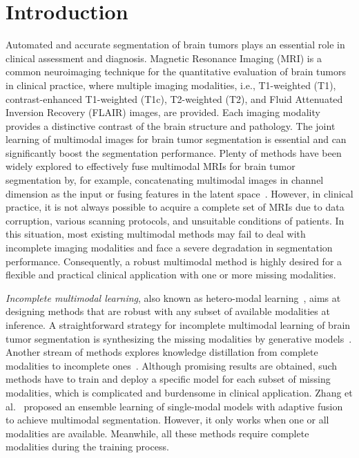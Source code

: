 \documentclass[runningheads]{llncs}
\begin{document}
\section{Introduction}
\label{sec:intro}

Automated and accurate segmentation of brain tumors plays an essential role in clinical assessment and diagnosis. Magnetic Resonance Imaging (MRI) is a common neuroimaging technique for the quantitative evaluation of brain tumors in clinical practice, where multiple imaging modalities, i.e., T1-weighted (T1), contrast-enhanced T1-weighted (T1c), T2-weighted (T2), and Fluid Attenuated Inversion Recovery (FLAIR) images, are provided. Each imaging modality provides a distinctive contrast of the brain structure and pathology. The joint learning of multimodal images for brain tumor segmentation is essential and can significantly boost the segmentation performance. Plenty of methods have been widely explored to effectively fuse multimodal MRIs for brain tumor segmentation by, for example, concatenating multimodal images in channel dimension as the input or fusing features in the latent space~\cite{zhou2018one,tseng2017joint}. 
However, in clinical practice, it is not always possible to acquire a complete set of MRIs due to data corruption, various scanning protocols, and unsuitable conditions of patients. In this situation, most existing multimodal methods may fail to deal with incomplete imaging modalities and face a severe degradation in segmentation performance. Consequently, a robust multimodal method is highly desired for a flexible and practical clinical application with one or more missing modalities.

\textit{Incomplete multimodal learning}, also known as hetero-modal learning~\cite{havaei2016hemis}, aims at designing methods that are robust with any subset of available modalities at inference. A straightforward strategy for incomplete multimodal learning of brain tumor segmentation is synthesizing the missing modalities by generative models~\cite{tulder2015does}. Another stream of methods explores knowledge distillation from complete modalities to incomplete ones~\cite{chen2021learning,hu2020knowledge,wang2021acn}. Although promising results are obtained, such methods have to train and deploy a specific model for each subset of missing modalities, which is complicated and burdensome in clinical application. Zhang et al.~\cite{zhang2021modality} proposed an ensemble learning of single-modal models with adaptive fusion to achieve multimodal segmentation. However, it only works when one or all modalities are available. Meanwhile, all these methods require complete modalities during the training process. 
\end{document}
